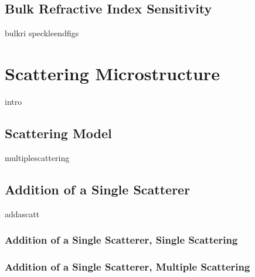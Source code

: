 \documentclass[12pt,a4paper,titlepage,onecolumn]{report}
\begin{document}
\section{Bulk Refractive Index Sensitivity}\label{sec:bulkri}
{bulkri}
\newpage
{speckleendfigs}

\chapter{Scattering Microstructure}\label{ch:scatteringmicro}
{intro}
\section{Scattering Model}
{multiplescattering}
\section{Addition of a Single Scatterer}
{addascatt}
\subsection{Addition of a Single Scatterer, Single Scattering}
\subsection{Addition of a Single Scatterer, Multiple Scattering}
\end{document}
